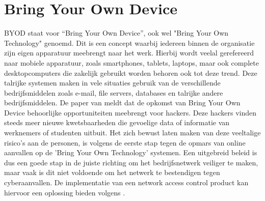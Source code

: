 \section{Bring Your Own Device}
BYOD staat voor “Bring Your Own Device”, ook wel "Bring Your Own Technology" genoemd. Dit is een concept waarbij iedereen binnen de organisatie zijn eigen apparatuur meebrengt naar het werk. Hierbij wordt veelal gerefereerd naar mobiele apparatuur, zoals smartphones, tablets, laptops, maar ook complete desktopcomputers die zakelijk gebruikt worden behoren ook tot deze trend. Deze talrijke systemen maken in vele situaties gebruik van de verschillende bedrijfsmiddelen zoals e-mail, file servers, databases en talrijke andere bedrijfsmiddelen.
\newline
\newline
De paper van \cite{Zakiah2017} meldt dat de opkomst van Bring Your Own Device behoorlijke opportuniteiten meebrengt voor hackers. Deze hackers vinden steeds meer nieuwe kwetsbaarheden die gevoelige data of informatie van werknemers of studenten uitbuit. Het zich bewust laten maken van deze veeltalige risico's aan de personen, is volgens \cite{Zakiah2017} de eerste stap tegen de opmars van online aanvallen op de 'Bring Your Own Technology' systemen.
\newline
\newline
Een uitgebreid beleid is dus een goede stap in de juiste richting om het bedrijfsnetwerk veiliger te maken, maar vaak is dit niet voldoende om het netwerk te bestendigen tegen cyberaanvallen. De implementatie van een network access control product kan hiervoor een oplossing bieden volgens \cite{Zakiah2017}.

